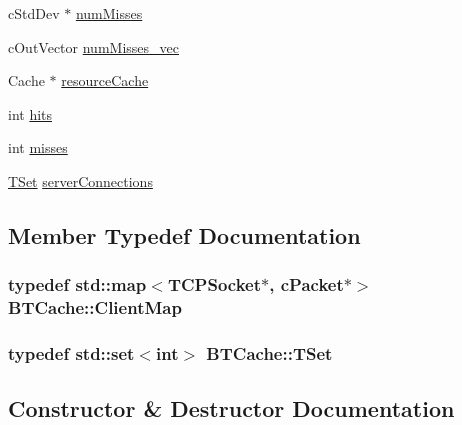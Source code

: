 \begin{DoxyCompactItemize}
c\+Std\+Dev $\ast$ \hyperlink{classBTCache_aeee4cfae3f278ceba5e900ab9c549f0e}{num\+Misses}
\item 
c\+Out\+Vector \hyperlink{classBTCache_ab687064d70f88dca7d7b5102fe2c1966}{num\+Misses\+\_\+vec}
\item 
Cache $\ast$ \hyperlink{classBTCache_ae126841ec3ca00972a328ff64a832e6a}{resource\+Cache}
\item 
int \hyperlink{classBTCache_a48ba69d513530368d210c5e97d19edbc}{hits}
\item 
int \hyperlink{classBTCache_a8ed86c3269e334690fb483a1884ee20a}{misses}
\item 
\hyperlink{classBTCache_ae334281f1ee5074cc1d6e82b661b60e4}{T\+Set} \hyperlink{classBTCache_a464a4dd8ca5b0313b24675deeb7fec6e}{server\+Connections}
\end{DoxyCompactItemize}


\subsection{Member Typedef Documentation}
\hypertarget{classBTCache_ac80b2a8f5787af11c89dbd05a187029e}{}
\subsubsection[{Client\+Map}]{\setlength{\rightskip}{0pt plus 5cm}typedef std\+::map$<$T\+C\+P\+Socket$\ast$, c\+Packet$\ast$$>$ {\bf B\+T\+Cache\+::\+Client\+Map}\hspace{0.3cm}{\ttfamily [protected]}}\label{classBTCache_ac80b2a8f5787af11c89dbd05a187029e}
\hypertarget{classBTCache_ae334281f1ee5074cc1d6e82b661b60e4}{}
\subsubsection[{T\+Set}]{\setlength{\rightskip}{0pt plus 5cm}typedef std\+::set$<$int$>$ {\bf B\+T\+Cache\+::\+T\+Set}\hspace{0.3cm}{\ttfamily [protected]}}\label{classBTCache_ae334281f1ee5074cc1d6e82b661b60e4}


\subsection{Constructor \& Destructor Documentation}
\hypertarget{classBTCache_a473a22048f77d193d17086f0d8cb3cc8}{}
